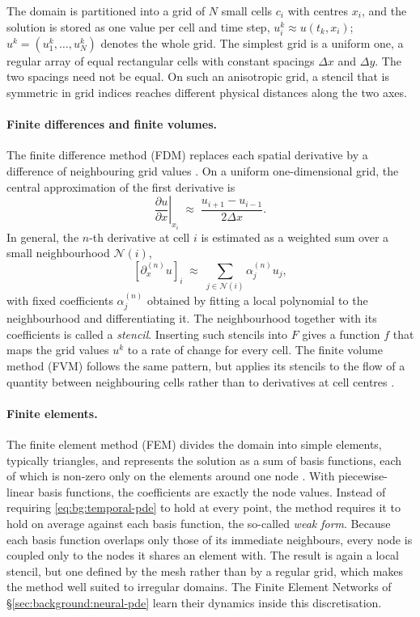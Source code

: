 The domain is partitioned into a grid of $N$ small cells $c_i$ with
centres $x_i$, and the solution is stored as one value per cell and
time step, $u_i^{k} \approx u(t_k, x_i)$;\newline
$u^{k} = (u_1^{k}, \dots, u_N^{k})$ denotes the whole grid. The simplest
grid is a uniform one, a regular array of equal rectangular cells with
constant spacings $\Delta x$ and $\Delta y$. The two spacings
need not be equal. On such an anisotropic grid, a stencil that is
symmetric in grid indices reaches different physical distances along the
two axes.

\paragraph{Finite differences and finite volumes.}
The finite difference method (FDM) replaces each spatial derivative by
a difference of neighbouring grid values \citep{LeVeque2007}. On a
uniform one-dimensional grid, the central approximation of the first derivative is
\begin{equation}
  \left.\frac{\partial u}{\partial x}\right|_{x_i}
  \;\approx\; \frac{u_{i+1} - u_{i-1}}{2 \Delta x}.
  \label{eq:bg:fdm-central}
\end{equation}
In general, the $n$-th derivative at cell $i$ is estimated as a
weighted sum over a small neighbourhood $\mathcal{N}(i)$,
\begin{equation}
  \left[\partial_x^{(n)} u\right]_i
  \;\approx\; \sum_{j \in \mathcal{N}(i)} \alpha_j^{(n)} u_j ,
  \label{eq:bg:stencil}
\end{equation}
with fixed coefficients $\alpha_j^{(n)}$ obtained by fitting a local
polynomial to the neighbourhood and differentiating it. The
neighbourhood together with its coefficients is called a
\emph{stencil}. Inserting such stencils into $F$ gives a function $f$
that maps the grid values $u^{k}$ to a rate of change for every cell.
The finite volume method (FVM) follows the same pattern, but applies
its stencils to the flow of a quantity between neighbouring cells
rather than to derivatives at cell centres \citep{LeVeque2002}.

\paragraph{Finite elements.}
The finite element method (FEM) divides the domain into simple
elements, typically triangles, and represents the solution as a sum of
basis functions, each of which is non-zero only on the elements around
one node \citep{Courant1943, LangtangenMardal2019}. With
piecewise-linear basis functions, the coefficients are exactly the node
values. Instead of requiring \eqref{eq:bg:temporal-pde} to hold at every
point, the method requires it to hold on average against each basis
function, the so-called \emph{weak form}. Because each basis function
overlaps only those of its immediate neighbours, every node is coupled
only to the nodes it shares an element with. The result is again a
local stencil, but one defined by the mesh rather than by a regular
grid, which makes the method well suited to irregular domains. The
Finite Element Networks of \S\ref{sec:background:neural-pde} learn their
dynamics inside this discretisation.


